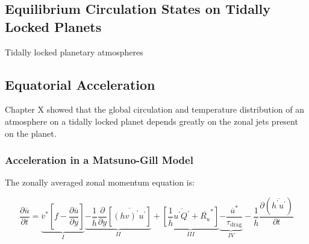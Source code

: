 \begin{SingleSpace}
\chapter{Equilibrium Circulation States on Tidally Locked Planets}\label{ch:eqm-circulation-states}
\vspace{0.5cm}
\end{SingleSpace}
\vspace{0.5cm}


Tidally locked planetary atmospheres








\section{Equatorial Acceleration}

Chapter X showed that the global circulation and temperature distribution of an atmosphere on a tidally locked planet depends greatly on the zonal jets present on the planet.


\subsection*{Acceleration in a Matsuno-Gill Model}

The zonally averaged zonal momentum equation is:

\begin{equation}
  \frac { \partial \overline { u } } { \partial t } = \underbrace { \overline { v } ^ { * } \left[ f - \frac { \partial \overline { u } } { \partial y } \right] } _ { I } \underbrace { - \frac { 1 } { \overline { h } } \frac { \partial } { \partial y } \left[ \overline { ( h v ) ^ { \prime } u ^ { \prime } } \right] } _ { I I } + \underbrace { \left[ \frac { 1 } { \overline { h } } \overline { u ^ { \prime } Q ^ { \prime } } + \overline { R _ { u } } ^ { * } \right] } _ { I I I } \underbrace { - \frac { \overline { u } ^ { * } } { \tau _ { \mathrm { drag } } } } _ { I V } - \frac { 1 } { \overline { h } } \frac { \partial \left( \overline { h ^ { \prime } u ^ { \prime } } \right) } { \partial t }
\end{equation}

